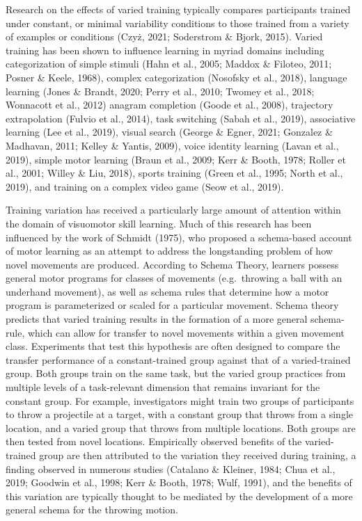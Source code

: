 \documentclass[
  jou, donotrepeattitle,floatsintext]{apa7}
\begin{document}
Research on the effects of varied training typically compares participants trained under constant, or minimal variability conditions to those trained from a variety of examples or conditions (Czyż, 2021; Soderstrom \& Bjork, 2015). Varied training has been shown to influence learning in myriad domains including categorization of simple stimuli (Hahn et al., 2005; Maddox \& Filoteo, 2011; Posner \& Keele, 1968), complex categorization (Nosofsky et al., 2018), language learning (Jones \& Brandt, 2020; Perry et al., 2010; Twomey et al., 2018; Wonnacott et al., 2012) anagram completion (Goode et al., 2008), trajectory extrapolation (Fulvio et al., 2014), task switching (Sabah et al., 2019), associative learning (Lee et al., 2019), visual search (George \& Egner, 2021; Gonzalez \& Madhavan, 2011; Kelley \& Yantis, 2009), voice identity learning (Lavan et al., 2019), simple motor learning (Braun et al., 2009; Kerr \& Booth, 1978; Roller et al., 2001; Willey \& Liu, 2018), sports training (Green et al., 1995; North et al., 2019), and training on a complex video game (Seow et al., 2019).

Training variation has received a particularly large amount of attention within the domain of visuomotor skill learning. Much of this research has been influenced by the work of Schmidt (1975), who proposed a schema-based account of motor learning as an attempt to address the longstanding problem of how novel movements are produced. According to Schema Theory, learners possess general motor programs for classes of movements (e.g.~throwing a ball with an underhand movement), as well as schema rules that determine how a motor program is parameterized or scaled for a particular movement. Schema theory predicts that varied training results in the formation of a more general schema-rule, which can allow for transfer to novel movements within a given movement class. Experiments that test this hypothesis are often designed to compare the transfer performance of a constant-trained group against that of a varied-trained group. Both groups train on the same task, but the varied group practices from multiple levels of a task-relevant dimension that remains invariant for the constant group. For example, investigators might train two groups of participants to throw a projectile at a target, with a constant group that throws from a single location, and a varied group that throws from multiple locations. Both groups are then tested from novel locations. Empirically observed benefits of the varied-trained group are then attributed to the variation they received during training, a finding observed in numerous studies (Catalano \& Kleiner, 1984; Chua et al., 2019; Goodwin et al., 1998; Kerr \& Booth, 1978; Wulf, 1991), and the benefits of this variation are typically thought to be mediated by the development of a more general schema for the throwing motion.
\end{document}
